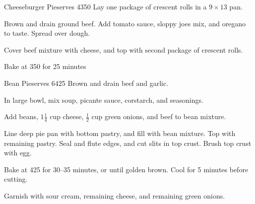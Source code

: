 
\begin{recipe}{Cheeseburger Pie}{serves 4}{350\0}
    Lay one package of crescent rolls in a $9 \times 13$ pan.

    Brown and drain ground beef. Add tomato sauce, sloppy joes mix, and oregano to taste. Spread over dough.

    Cover beef mixture with cheese, and top with second package of crescent rolls.

    \newstep
    Bake at 350\0 for 25 minutes
\end{recipe}

\begin{recipe}{Bean Pie}{serves 6}{425\0}
    Brown and drain beef and garlic.

    In large bowl, mix soup, picante sauce, corstarch, and seasonings.

    Add beans, $1\frac{1}{4}$ cup cheese, $\frac{1}{2}$ cup green onions, and beef to bean mixture.

    Line deep pie pan with bottom pastry, and fill with bean mixture. Top with remaining pastry. Seal and flute edges, and cut slits in top crust. Brush top crust with egg.

    \newstep
    Bake at 425\0 for 30--35 minutes, or until golden brown. Cool for 5 minutes before cutting.

    \newstep
    Garnish with sour cream, remaining cheese, and remaining green onions.
\end{recipe}

